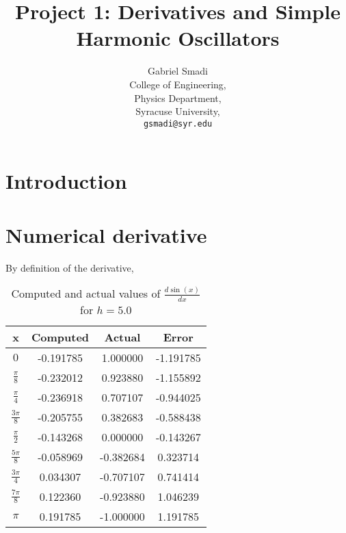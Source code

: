 \documentclass{article}
\begin{document}
\title{Project 1: Derivatives and Simple Harmonic Oscillators}

\author{Gabriel Smadi\\
  College of Engineering, \\
  Physics Department, \\
  Syracuse University,\\
  \texttt{gsmadi@syr.edu}}
\maketitle

\begin{abstract}
\end{abstract}

\section{Introduction}

\section{Numerical derivative}
By definition of the derivative,


\begin{table}[H]
  \begin{center}
    \begin{tabular}{|c|c|c|c|}
      \hline
      x & Computed & Actual & Error \\
      \hline
      \( 0 \) & -0.191785 & 1.000000 & -1.191785 \\
      \hline
      \( \frac{\pi}{8} \) & -0.232012 & 0.923880 & -1.155892 \\
      \hline
      \( \frac{\pi}{4} \) & -0.236918 & 0.707107 & -0.944025 \\
      \hline
      \( \frac{3 \pi}{8} \) & -0.205755 & 0.382683 & -0.588438 \\
      \hline
      \( \frac{\pi}{2} \) & -0.143268 & 0.000000 & -0.143267 \\
      \hline
      \( \frac{5 \pi}{8} \) & -0.058969 & -0.382684 & 0.323714 \\
      \hline
      \( \frac{3 \pi}{4} \) & 0.034307 & -0.707107 & 0.741414 \\
      \hline
      \( \frac{7 \pi}{8} \) & 0.122360 & -0.923880 & 1.046239 \\
      \hline
      \( \pi \) & 0.191785 & -1.000000 & 1.191785 \\
      \hline
    \end{tabular}
  \end{center}
  \caption {Computed and actual values of \( \frac{d \sin(x)}{dx} \) for $h=5.0$}
  \label{table:comparison}
\end{table}
\end{document}
